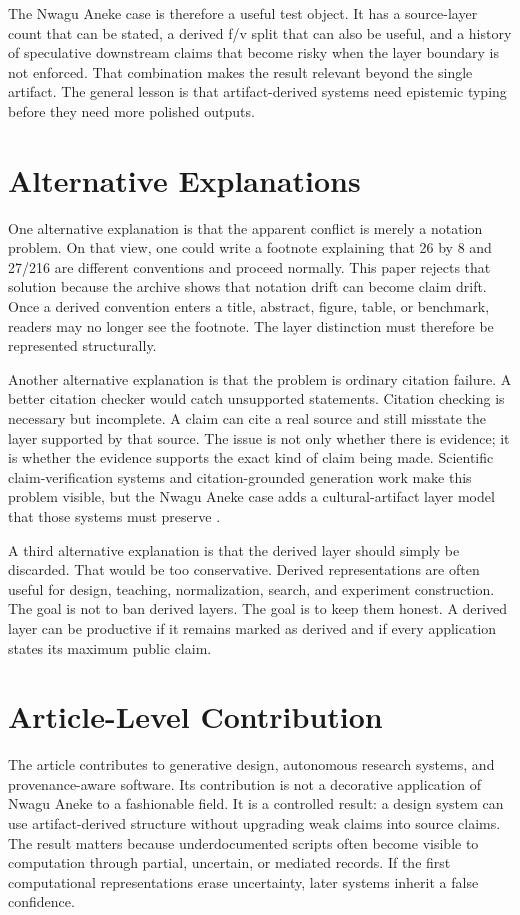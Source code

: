 \documentclass[sigconf,nonacm]{acmart}
\begin{document}
The Nwagu Aneke case is therefore a useful test object. It has a source-layer
count that can be stated, a derived f/v split that can also be useful, and a
history of speculative downstream claims that become risky when the layer
boundary is not enforced. That combination makes the result relevant beyond the
single artifact. The general lesson is that artifact-derived systems need
epistemic typing before they need more polished outputs.

\section{Alternative Explanations}
One alternative explanation is that the apparent conflict is merely a notation
problem. On that view, one could write a footnote explaining that 26 by 8 and
27/216 are different conventions and proceed normally. This paper rejects that
solution because the archive shows that notation drift can become claim drift.
Once a derived convention enters a title, abstract, figure, table, or benchmark,
readers may no longer see the footnote. The layer distinction must therefore be
represented structurally.

Another alternative explanation is that the problem is ordinary citation
failure. A better citation checker would catch unsupported statements. Citation
checking is necessary but incomplete. A claim can cite a real source and still
misstate the layer supported by that source. The issue is not only whether there
is evidence; it is whether the evidence supports the exact kind of claim being
made. Scientific claim-verification systems and citation-grounded generation
work make this problem visible, but the Nwagu Aneke case adds a cultural-artifact
layer model that those systems must preserve \cite{wadden2020scifact,gao2023alce}.

A third alternative explanation is that the derived layer should simply be
discarded. That would be too conservative. Derived representations are often
useful for design, teaching, normalization, search, and experiment construction.
The goal is not to ban derived layers. The goal is to keep them honest. A
derived layer can be productive if it remains marked as derived and if every
application states its maximum public claim.

\section{Article-Level Contribution}
The article contributes to generative design, autonomous research systems, and provenance-aware software. Its contribution is not a decorative
application of Nwagu Aneke to a fashionable field. It is a controlled result:
a design system can use artifact-derived structure without upgrading weak claims into source claims. The result matters because underdocumented scripts often become
visible to computation through partial, uncertain, or mediated records. If the
first computational representations erase uncertainty, later systems inherit a
false confidence.
\end{document}
